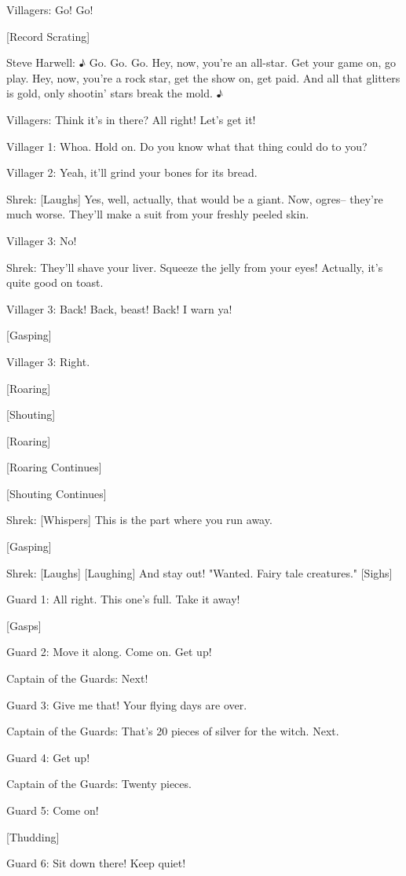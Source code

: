\documentclass{article}
\begin{document}
Villagers:
Go! Go!

[Record Scrating]

Steve Harwell:
♪ Go. Go. Go. Hey, now, you're an all-star. Get your game on, go play. Hey, now, you're a rock star, get the show on, get paid. And all that glitters is gold, only shootin' stars break the mold. ♪

Villagers:
Think it's in there? All right! Let's get it!

Villager 1:
Whoa. Hold on. Do you know what that thing could do to you?

Villager 2:
Yeah, it'll grind your bones for its bread.

Shrek:
[Laughs] Yes, well, actually, that would be a giant. Now, ogres-- they're much worse. They'll make a suit from your freshly peeled skin.

Villager 3:
No!

Shrek:
They'll shave your liver. Squeeze the jelly from your eyes! Actually, it's quite good on toast.

Villager 3:
Back! Back, beast! Back! I warn ya!

[Gasping]

Villager 3:
Right.

[Roaring]

[Shouting]

[Roaring]

[Roaring Continues]

[Shouting Continues]

Shrek:
[Whispers] This is the part where you run away.

[Gasping]

Shrek:
[Laughs] [Laughing] And stay out! "Wanted. Fairy tale creatures." [Sighs]

Guard 1:
All right. This one's full. Take it away!

[Gasps]

Guard 2:
Move it along. Come on. Get up!

Captain of the Guards: Next!

Guard 3:
Give me that! Your flying days are over.

Captain of the Guards: That's 20 pieces of silver for the witch. Next.

Guard 4:
Get up!

Captain of the Guards: Twenty pieces.

Guard 5:
Come on!

[Thudding]

Guard 6:
Sit down there! Keep quiet!
\end{document}
